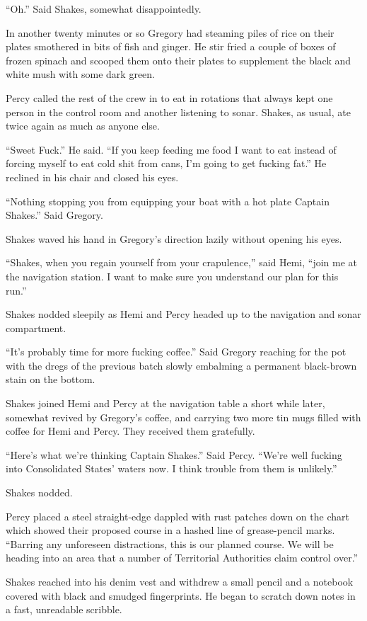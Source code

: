 \documentclass[]{scrbook}
\begin{document}
``Oh.'' Said Shakes, somewhat disappointedly.

In another twenty minutes or so Gregory had steaming piles of rice on
their plates smothered in bits of fish and ginger. He stir fried a
couple of boxes of frozen spinach and scooped them onto their plates to
supplement the black and white mush with some dark green.

Percy called the rest of the crew in to eat in rotations that always
kept one person in the control room and another listening to sonar.
Shakes, as usual, ate twice again as much as anyone else.

``Sweet Fuck.'' He said. ``If you keep feeding me food I want to eat
instead of forcing myself to eat cold shit from cans, I'm going to get
fucking fat.'' He reclined in his chair and closed his eyes.

``Nothing stopping you from equipping your boat with a hot plate Captain
Shakes.'' Said Gregory.

Shakes waved his hand in Gregory's direction lazily without opening his
eyes.

``Shakes, when you regain yourself from your crapulence,'' said Hemi,
``join me at the navigation station. I want to make sure you understand
our plan for this run.''

Shakes nodded sleepily as Hemi and Percy headed up to the navigation and
sonar compartment.

``It's probably time for more fucking coffee.'' Said Gregory reaching
for the pot with the dregs of the previous batch slowly embalming a
permanent black-brown stain on the bottom.

Shakes joined Hemi and Percy at the navigation table a short while
later, somewhat revived by Gregory's coffee, and carrying two more tin
mugs filled with coffee for Hemi and Percy. They received them
gratefully.

``Here's what we're thinking Captain Shakes.'' Said Percy. ``We're well
fucking into Consolidated States' waters now. I think trouble from them
is unlikely.''

Shakes nodded.

Percy placed a steel straight-edge dappled with rust patches down on the
chart which showed their proposed course in a hashed line of
grease-pencil marks. ``Barring any unforeseen distractions, this is our
planned course. We will be heading into an area that a number of
Territorial Authorities claim control over.''

Shakes reached into his denim vest and withdrew a small pencil and a
notebook covered with black and smudged fingerprints. He began to
scratch down notes in a fast, unreadable scribble.
\end{document}
